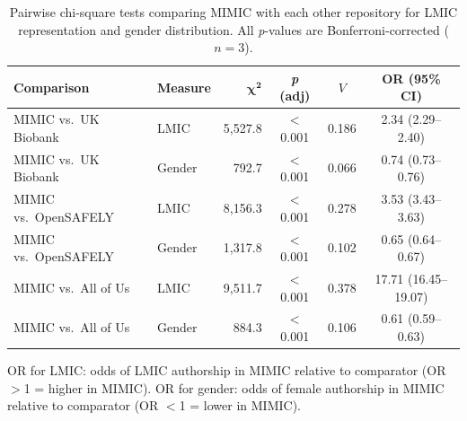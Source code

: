 \documentclass[11pt]{article}
\begin{document}
\begin{table}[H]
\centering
\caption{Pairwise chi-square tests comparing MIMIC with each other repository for LMIC representation and gender distribution. All \textit{p}-values are Bonferroni-corrected ($n = 3$).}
\label{etab:pairwise}
\small
\begin{tabular}{@{}llrccc@{}}
\toprule
\textbf{Comparison} & \textbf{Measure} & $\boldsymbol{\chi^2}$ & \textbf{\textit{p} (adj)} & \textbf{$V$} & \textbf{OR (95\% CI)} \\
\midrule
MIMIC vs.\ UK Biobank & LMIC & 5,527.8 & $<$0.001 & 0.186 & 2.34 (2.29--2.40) \\
MIMIC vs.\ UK Biobank & Gender & 792.7 & $<$0.001 & 0.066 & 0.74 (0.73--0.76) \\
MIMIC vs.\ OpenSAFELY & LMIC & 8,156.3 & $<$0.001 & 0.278 & 3.53 (3.43--3.63) \\
MIMIC vs.\ OpenSAFELY & Gender & 1,317.8 & $<$0.001 & 0.102 & 0.65 (0.64--0.67) \\
MIMIC vs.\ All of Us & LMIC & 9,511.7 & $<$0.001 & 0.378 & 17.71 (16.45--19.07) \\
MIMIC vs.\ All of Us & Gender & 884.3 & $<$0.001 & 0.106 & 0.61 (0.59--0.63) \\
\bottomrule
\end{tabular}

\vspace{4pt}
{\footnotesize OR for LMIC: odds of LMIC authorship in MIMIC relative to comparator (OR $>$1 = higher in MIMIC). OR for gender: odds of female authorship in MIMIC relative to comparator (OR $<$1 = lower in MIMIC).}
\end{table}
\end{document}
